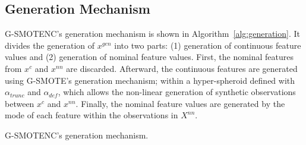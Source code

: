 \documentclass[preprint,12pt]{elsarticle}
\begin{document}
{\subsection{Generation Mechanism}

G-SMOTENC's generation mechanism is shown in Algorithm~\ref{alg:generation}.
It divides the generation of $x^{gen}$ into two parts: (1) generation of
continuous feature values and (2) generation of nominal feature values.
First, the nominal features from $x^c$ and $x^{nn}$ are discarded. Afterward,
the continuous features are generated using G-SMOTE's generation mechanism;
within a hyper-spheroid defined with $\alpha_{trunc}$ and $\alpha_{def}$,
which allows the non-linear generation of synthetic observations between $x^c$
and $x^{nn}$. Finally, the nominal feature values are generated by the mode of
each feature within the observations in $X^{nn}$.

\begin{algorithm}
    \caption{G-SMOTENC's generation mechanism.}\label{alg:generation}
    \DontPrintSemicolon%








\end{algorithm}}
\end{document}

